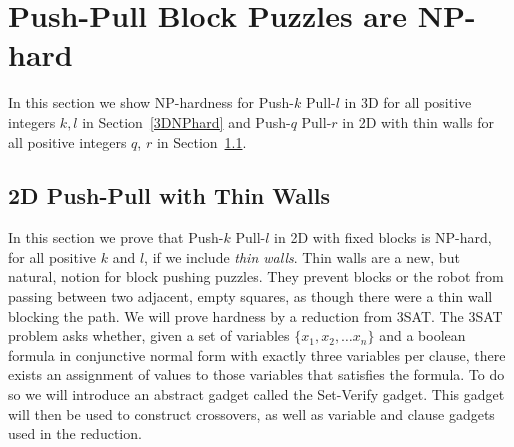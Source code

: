 
\section{Push-Pull Block Puzzles are NP-hard}
In this section we show NP-hardness for Push-$k$ Pull-$l$ in 3D for all positive integers $k, l$ in Section~\ref{3DNPhard} and Push-$q$ Pull-$r$ in 2D with thin walls for all positive integers $q$, $r$ in Section~\ref{2DNPhard}. 

 


\subsection{2D Push-Pull with Thin Walls}
\label{2DNPhard}
In this section we prove that Push-$k$ Pull-$l$ in 2D with fixed blocks is NP-hard, for all positive $k$ and $l$, if we include \emph{thin walls}. Thin walls are a new, but natural, notion for block pushing puzzles. They prevent blocks or the robot from passing between two adjacent, empty squares, as though there were a thin wall blocking the path. We will prove hardness by a reduction from 3SAT. The 3SAT problem asks whether, given a set of variables $\{x_1, x_2, \ldots x_n\}$ and a boolean formula in conjunctive normal form with exactly three variables per clause, there exists an assignment of values to those variables that satisfies the formula\cite{NPBook}. To do so we will introduce an abstract gadget called the Set-Verify gadget. This gadget will then be used to construct crossovers, as well as variable and clause gadgets used in the reduction.

